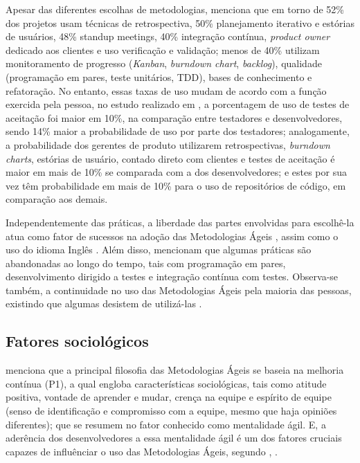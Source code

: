 Apesar das diferentes escolhas de metodologias, \citeauthor{Diebold} \citeyear{Diebold} menciona que em torno de 52\% dos projetos usam técnicas de retrospectiva, 50\% planejamento iterativo e estórias de usuários, 48\% standup meetings, 40\% integração contínua, \textit{product owner} dedicado aos clientes e uso verificação e validação; menos de 40\% utilizam monitoramento de progresso (\textit{Kanban}, \textit{burndown chart}, \textit{backlog}), qualidade (programação em pares, teste unitários, TDD), bases de conhecimento e refatoração. No entanto, essas taxas de uso mudam de acordo com a função exercida pela pessoa, no estudo realizado em \citeauthor{Murphy2013} \citeyear{Murphy2013}, a porcentagem de uso de testes de aceitação foi maior em 10\%, na comparação entre testadores e desenvolvedores, sendo 14\% maior a probabilidade de uso por parte dos testadores; analogamente, a probabilidade dos gerentes de produto utilizarem retrospectivas, \textit{burndown charts}, estórias de usuário, contado direto com clientes e testes de aceitação é maior em mais de 10\% se comparada com a dos desenvolvedores; e estes por sua vez têm probabilidade em mais de 10\% para o uso de repositórios de código, em comparação aos demais.   

Independentemente das práticas, a liberdade das partes envolvidas para escolhê-la atua como fator de sucessos na adoção das Metodologias Ágeis \citeauthor{Pikkarainen2012} \citeyear{Pikkarainen2012}, assim como o uso do idioma Inglês \citeauthor{Asnawi2014} \citeyear{Asnawi2014}. Além disso, \citeauthor{Solinski2016} \citeyear{Solinski2016} mencionam que algumas práticas são abandonadas ao longo do tempo, tais com programação em pares, desenvolvimento dirigido a testes e integração contínua com testes. Observa-se também, a continuidade no uso das Metodologias Ágeis pela maioria das pessoas, existindo que algumas desistem de utilizá-las \citeauthor{Murphy2013} \citeyear{Murphy2013}.  

\subsection{Fatores sociológicos}

\citeauthor{Senapathi2014} \citeyear{Senapathi2014} menciona que a principal filosofia das Metodologias Ágeis se baseia na melhoria contínua (P1), a qual engloba características sociológicas, tais como atitude positiva, vontade de aprender e mudar, crença na equipe e espírito de equipe (senso de identificação e compromisso com a equipe, mesmo que haja opiniões diferentes); que se resumem no fator conhecido como mentalidade ágil. E, a aderência dos desenvolvedores a essa mentalidade ágil é um dos fatores cruciais capazes de influênciar o uso das Metodologias Ágeis, segundo \citeauthor{Asnawi2011} \citeyear{Asnawi2011}, \citeyear{Asnawi2012}.

